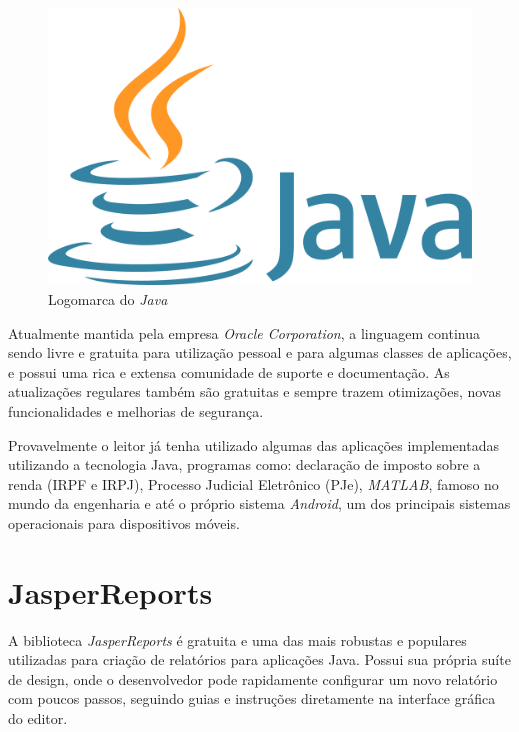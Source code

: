 \documentclass[
	12pt,			%
	openright,		%
	oneside,	
	a4paper,		%
	english,		%
	brazil			%
]{abntex2/abntex2}  %
\begin{document}
			\begin{figure}[h]
				\begin{center}
				
					\caption{Logomarca do \textit{Java}}
					\label{java-img}
								
					\includegraphics[scale=0.04]{img/java-logo}
					
					
				\end{center}
			\end{figure}
		
			Atualmente mantida pela empresa \textit{Oracle Corporation}, a linguagem continua sendo livre e gratuita para utilização pessoal e para algumas classes de aplicações, e possui uma rica e extensa comunidade de suporte e documentação. As atualizações regulares também são gratuitas e sempre trazem otimizações, novas funcionalidades e melhorias de segurança.

			Provavelmente o leitor já tenha utilizado algumas das aplicações implementadas utilizando a tecnologia Java, programas como: declaração de imposto sobre a renda (IRPF e IRPJ), Processo Judicial Eletrônico (PJe), \textit{MATLAB}, famoso no mundo da engenharia e até o próprio sistema \textit{Android}, um dos principais sistemas operacionais para dispositivos móveis.
		
		\section{JasperReports\textregistered} \label{jasper-reports}
		
			A biblioteca \textit{JasperReports\textregistered} \cite{jasper} é gratuita e uma das mais robustas e populares utilizadas para criação de relatórios para aplicações Java. Possui sua própria suíte de design, onde o desenvolvedor pode rapidamente configurar um novo relatório com poucos passos, seguindo guias e instruções diretamente na interface gráfica do editor.
			
\end{document}
